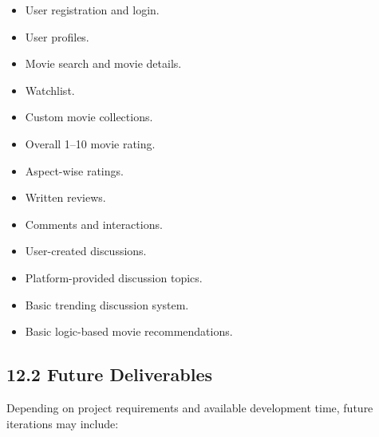 \documentclass[11pt,a4paper]{article}
\begin{document}
\begin{itemize}

    \item User registration and login.

    \item User profiles.

    \item Movie search and movie details.

    \item Watchlist.

    \item Custom movie collections.

    \item Overall 1--10 movie rating.

    \item Aspect-wise ratings.

    \item Written reviews.

    \item Comments and interactions.

    \item User-created discussions.

    \item Platform-provided discussion topics.

    \item Basic trending discussion system.

    \item Basic logic-based movie recommendations.

\end{itemize}


\subsection{12.2 Future Deliverables}

Depending on project requirements and available development time, future iterations may include:
\end{document}
